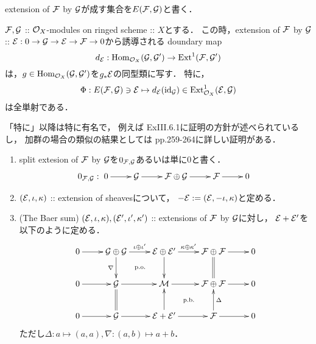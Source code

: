 \documentclass[a4paper]{jsarticle}
\makeatletter
\newcommand{\centerpb}{\ar@{}[lu]|{\text{p.b.}}}
\newcommand{\centerpo}{\ar@{}[lu]|{\text{p.o.}}}
\newcommand{\diag}{\Delta}
\newcommand{\codiag}{\nabla}
\makeatother
\begin{document}
    extension of $\shF$ by $\shG$が成す集合を$E(\shF, \shG)$と書く．
    \begin{Thm}\label{thm:ExtAndExt1}
        $\shF, \shG$
        :: $\shO_X$-modules on ringed scheme :: $X$とする．
        この時，extension of $\shF$ by $\shG$
            :: $\shE: 0 \to \shG \to \shE \to \shF \to 0$から誘導される
        doundary map
        \[ d_{\shE}: \Hom_{\shO_X}(\shG, \shG') \to \Ext^1(\shF, \shG') \]
        は，$g \in \Hom_{\shO_X}(\shG, \shG')$を$g_*\shE$の同型類に写す．
        特に，
        \[ \Phi: E(\shF, \shG) \ni \shE \mapsto d_{\shE}(\id[\shG]) \in \Ext^1_{\shO_X}(\shE, \shG) \]
        は全単射である．
    \end{Thm}
    「特に」以降は特に有名で，
    例えば\cite{HarAG} ExIII.6.1に証明の方針が述べられているし，
    加群の場合の類似の結果としては\cite{Shiho} pp.259-264に詳しい証明がある．

    \begin{Def}
        \begin{enumerate}[label=(\arabic*), leftmargin=*]
        \item
            split extesion of $\shF$ by $\shG$を$0_{\shF, \shG}$あるいは単に$0$と書く．
            \[
            0_{\shF, \shG}:
                \xymatrix{
                    0 \ar[r]& \shG \ar[r]& \shF \oplus \shG \ar[r]& \shF \ar[r]& 0
            }\]
            
        \item
            $(\shE, \iota, \kappa)$ :: extension of sheavesについて，
            $-\shE:=(\shE, -\iota, \kappa)$と定める．

        \item
            (The Baer sum)
            $(\shE, \iota, \kappa), (\shE', \iota', \kappa')$
            :: extensions of $\shF$ by $\shG$に対し，
            $\shE+\shE'$を以下のように定める．
            \[\vcenter{\xymatrix{
                0 \ar[r]& \shG \oplus \shG \ar[r]^-{\iota \oplus \iota'}\ar[d]_-{\codiag}& \shE \oplus \shE' \ar[r]^-{\kappa \oplus \kappa'}\ar[d]& \shF \oplus \shF \ar[r]\ar@{=}[d]& 0\\
                0 \ar[r]& \shG \ar[r]& \shM \ar[r]\centerpo& \shF \oplus \shF\ar[r]& 0\\
                0 \ar[r]& \shG \ar[r]\ar@{=}[u]& \shE+\shE' \ar[r]\ar[u]& \shF \ar[r]\ar[u]_-{\diag}\centerpb& 0 \\
            }}\]
            ただし$\diag: a \mapsto (a,a), \codiag: (a,b) \mapsto a+b$．
    \end{enumerate}
    \end{Def}
    
\end{document}
